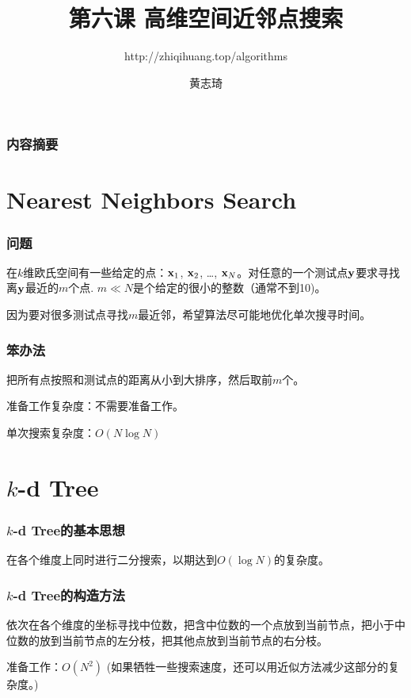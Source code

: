 \documentclass[CJK]{beamer}
\begin{document}
\bch

\title{第六课  高维空间近邻点搜索}
\subtitle{http://zhiqihuang.top/algorithms}
  \author{黄志琦}
  \date{}

  \maketitle

  \begin{frame}
    \frametitle{内容摘要}
  \tableofcontents
  \end{frame}

  \section{Nearest Neighbors Search}

  \begin{frame}
    \frametitle{问题}
    在$k$维欧氏空间有一些给定的点：${\mathbf{x}}_1$, ${\mathbf{x}}_2$, \ldots, ${\mathbf{x}}_N$。对任意的一个测试点${\mathbf{y}}$要求寻找离${\mathbf{y}}$最近的$m$个点. $m\ll N$是个给定的很小的整数（通常不到10)。

    \skipline
    
    因为要对很多测试点寻找$m$最近邻，希望算法尽可能地优化单次搜寻时间。
  \end{frame}


  \begin{frame}
    \frametitle{笨办法}
    把所有点按照和测试点的距离从小到大排序，然后取前$m$个。

    \skiplines

    准备工作复杂度：不需要准备工作。
    
    单次搜索复杂度：$O(N\log N)$
  \end{frame}
  

  \section{$k$-d Tree}
  
  \begin{frame}
    \frametitle{$k$-d Tree的基本思想}

    在各个维度上同时进行二分搜索，以期达到$O(\log N)$的复杂度。
    
  \end{frame}


  \begin{frame}
    \frametitle{$k$-d Tree的构造方法}

    依次在各个维度的坐标寻找中位数，把含中位数的一个点放到当前节点，把小于中位数的放到当前节点的左分枝，把其他点放到当前节点的右分枝。


    \skiplines
    
    准备工作：$O(N^2)$ (如果牺牲一些搜索速度，还可以用近似方法减少这部分的复杂度。)
    
  \end{frame}
\end{document}
